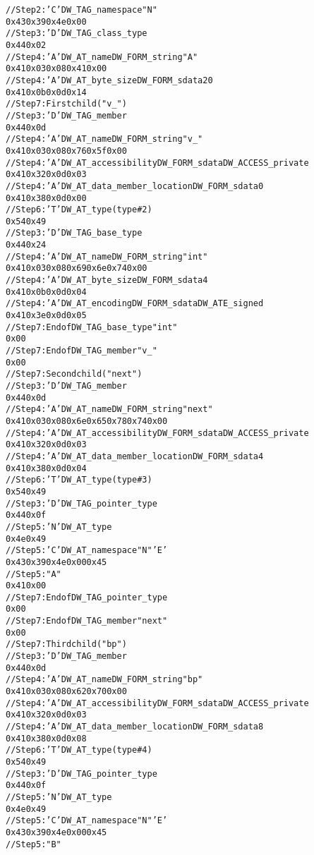 \begin{alltt}
// Step 2: 'C' DW\_TAG\_namespace "N"
0x43 0x39 0x4e 0x00
// Step 3: 'D' DW\_TAG\_class\_type
0x44 0x02
// Step 4: 'A' DW\_AT\_name DW\_FORM\_string "A"
0x41 0x03 0x08 0x41 0x00
// Step 4: 'A' DW\_AT\_byte\_size DW\_FORM\_sdata 20
0x41 0x0b 0x0d 0x14
// Step 7: First child ("v\_")
    // Step 3: 'D' DW\_TAG\_member
    0x44 0x0d
    // Step 4: 'A' DW\_AT\_name DW\_FORM\_string "v\_"
    0x41 0x03 0x08 0x76 0x5f 0x00
    // Step 4: 'A' DW\_AT\_accessibility DW\_FORM\_sdata DW\_ACCESS\_private
    0x41 0x32 0x0d 0x03
    // Step 4: 'A' DW\_AT\_data\_member\_location DW\_FORM\_sdata 0
    0x41 0x38 0x0d 0x00
    // Step 6: 'T' DW\_AT\_type (type \#2)
    0x54 0x49
        // Step 3: 'D' DW\_TAG\_base\_type
        0x44 0x24
        // Step 4: 'A' DW\_AT\_name DW\_FORM\_string "int"
        0x41 0x03 0x08 0x69 0x6e 0x74 0x00
        // Step 4: 'A' DW\_AT\_byte\_size DW\_FORM\_sdata 4
        0x41 0x0b 0x0d 0x04
        // Step 4: 'A' DW\_AT\_encoding DW\_FORM\_sdata DW\_ATE\_signed
        0x41 0x3e 0x0d 0x05
        // Step 7: End of DW\_TAG\_base\_type "int"
        0x00
    // Step 7: End of DW\_TAG\_member "v\_"
    0x00
// Step 7: Second child ("next")
    // Step 3: 'D' DW\_TAG\_member
    0x44 0x0d
    // Step 4: 'A' DW\_AT\_name DW\_FORM\_string "next"
    0x41 0x03 0x08 0x6e 0x65 0x78 0x74 0x00
    // Step 4: 'A' DW\_AT\_accessibility DW\_FORM\_sdata DW\_ACCESS\_private
    0x41 0x32 0x0d 0x03
    // Step 4: 'A' DW\_AT\_data\_member\_location DW\_FORM\_sdata 4
    0x41 0x38 0x0d 0x04
    // Step 6: 'T' DW\_AT\_type (type \#3)
    0x54 0x49
        // Step 3: 'D' DW\_TAG\_pointer\_type
        0x44 0x0f
        // Step 5: 'N' DW\_AT\_type
        0x4e 0x49
        // Step 5: 'C' DW\_AT\_namespace "N" 'E'
        0x43 0x39 0x4e 0x00 0x45
        // Step 5: "A"
        0x41 0x00
        // Step 7: End of DW\_TAG\_pointer\_type
        0x00
    // Step 7: End of DW\_TAG\_member "next"
    0x00
// Step 7: Third child ("bp")
    // Step 3: 'D' DW\_TAG\_member
    0x44 0x0d
    // Step 4: 'A' DW\_AT\_name DW\_FORM\_string "bp"
    0x41 0x03 0x08 0x62 0x70 0x00
    // Step 4: 'A' DW\_AT\_accessibility DW\_FORM\_sdata DW\_ACCESS\_private
    0x41 0x32 0x0d 0x03
    // Step 4: 'A' DW\_AT\_data\_member\_location DW\_FORM\_sdata 8
    0x41 0x38 0x0d 0x08
    // Step 6: 'T' DW\_AT\_type (type \#4)
    0x54 0x49
        // Step 3: 'D' DW\_TAG\_pointer\_type
0x44 0x0f
        // Step 5: 'N' DW\_AT\_type
        0x4e 0x49
        // Step 5: 'C' DW\_AT\_namespace "N" 'E'
        0x43 0x39 0x4e 0x00 0x45
        // Step 5: "B"

\end{alltt}
